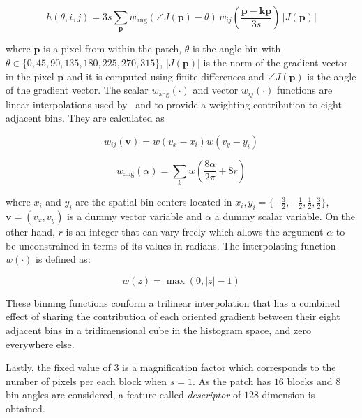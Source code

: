 \begin{equation}
 h(\theta,i,j) = 3 s \sum_{\mathbf{p}} w_\mathrm{ang}(\angle J(\mathbf{p}) - \theta)\, w_{ij}\left(\frac{\mathbf{p} - \mathbf{kp}}{3 s}\right)\, |J(\mathbf{p})|
\label{eq:histogram}
\end{equation}

\noindent  where $\mathbf{p}$ is a pixel from within the patch,  $\theta$ is the angle bin with $ \theta \in \{0, 45, 90, 135, 180, 225, 270, 315\} $,  $ |J(\mathbf{p})| $ is the norm of the gradient vector in the pixel $\mathbf{p}$ and it is computed using finite differences and $\angle J(\mathbf{p}) $ is the angle of the gradient vector.  The scalar $ w_\mathrm{ang}(\cdot) $  and vector $ w_{ij}(\cdot) $ functions are linear interpolations used by~\cite{Lowe2004} and \cite{Vedaldi2010} to provide a weighting contribution to eight adjacent bins.  They are calculated as  

\begin{equation}
 w_{ij}(\mathbf{v}) = w( v_x - x_i ) w( v_y - y_i ) 
\label{eq:ij}
\end{equation}

\begin{equation}
 w_\mathrm{ang}(\alpha) = \sum_{k} w( \frac{8\alpha}{2\pi} + 8r)
\label{eq:wang}
\end{equation}

\noindent where $x_i$ and $y_i$ are the spatial bin centers located in $ x_i,y_i = \{-\frac{3}{2},-\frac{1}{2},\frac{1}{2},\frac{3}{2}\} $, $\mathbf{v} = ( v_x, v_y ) $ is a dummy vector variable and $\alpha$ a dummy scalar variable.  On the other hand, $r$ is an integer that can vary freely which allows the argument $\alpha$ to be unconstrained in terms of its values in radians. The interpolating function $w(\cdot)$ is defined as:

\begin{equation}
 w(z) = \max(0,|z|-1)
\label{eq:weighting}
\end{equation}

These binning functions conform a trilinear interpolation that has a combined effect of sharing the contribution of each oriented gradient between their eight adjacent bins in a tridimensional cube in the histogram space, and zero everywhere else.

Lastly, the fixed value of $ 3 $ is a magnification factor which corresponds to the number of pixels per each block when $s = 1$.  As the patch has  $16$ blocks and  $8$ bin angles are considered, a feature called \textit{descriptor} of $128$ dimension is obtained. 

